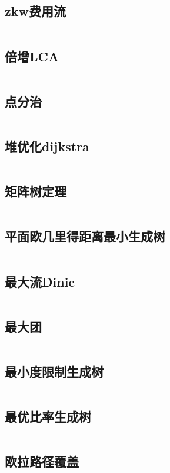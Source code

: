 \documentclass[UTF8]{ctexart}
\begin{document}
\subsection{zkw费用流}
\inputminted{cpp}{graphtheory/zkw费用流.cpp}
\subsection{倍增LCA}
\inputminted{cpp}{graphtheory/倍增LCA.cpp}
\subsection{点分治}
\inputminted{cpp}{graphtheory/点分治.cpp}
\subsection{堆优化dijkstra}
\inputminted{cpp}{graphtheory/堆优化dijkstra.cpp}
\subsection{矩阵树定理}
\inputminted{cpp}{graphtheory/矩阵树定理.cpp}
\subsection{平面欧几里得距离最小生成树}
\inputminted{cpp}{graphtheory/平面欧几里得距离最小生成树.cpp}
\subsection{最大流Dinic}
\inputminted{cpp}{graphtheory/最大流Dinic.cpp}
\subsection{最大团}
\inputminted{cpp}{graphtheory/最大团.cpp}
\subsection{最小度限制生成树}
\inputminted{cpp}{graphtheory/最小度限制生成树.cpp}
\subsection{最优比率生成树}
\inputminted{cpp}{graphtheory/最优比率生成树.cpp}
\subsection{欧拉路径覆盖}
\inputminted{cpp}{graphtheory/欧拉路径覆盖.cpp}
\end{document}
